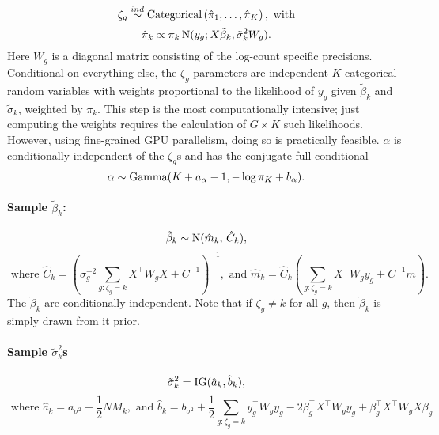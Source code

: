 \begin{itemize}
\begin{equation*}
\zeta_g \stackrel{ind}{\sim} \operatorname{Categorical}\left(\hat{\pi}_1,\ldots,\hat{\pi}_K \right), \mbox{ with}
\end{equation*}
\begin{equation*}
\hat{\pi}_k \propto \pi_k \operatorname{N}(y_g;X\tilde{\beta}_k,\tilde{\sigma}_k^2 W_g).
\end{equation*}
Here $W_g$ is a diagonal matrix consisting of the log-count specific precisions. Conditional on everything else, the $\zeta_g$ parameters are independent $K$-categorical random variables with weights proportional to the likelihood of $y_g$ given $\tilde{\beta}_k$ and $\tilde{\sigma}_k$, weighted by $\pi_k$. This step is the most computationally intensive; just computing the weights requires the calculation of $G\times K$ such likelihoods. However, using fine-grained GPU parallelism, doing so is practically feasible. $\alpha$ is conditionally independent of the $\zeta_g$s and has the conjugate full conditional
\begin{equation*}
\alpha \sim \operatorname{Gamma}(K + a_\alpha - 1, -\log \pi_K + b_\alpha).
\end{equation*}


\paragraph{Sample $\tilde{\beta}_k$:}
\begin{equation*}
\tilde{\beta}_k \sim \operatorname{N}(\hat{m}_k,\, \hat{C}_k),
\end{equation*}
\begin{equation*}
\mbox{ where }\hat{C}_k= \left( \sigma^{-2}_g\sum_{g:\zeta_g=k}
  X^\top W_g X + C^{-1} \right)^{-1}, \mbox{ and }\hat{m}_k=\hat{C}_k \left(\sum_{g:\zeta_g=k} X^\top W_g y_g +
      C^{-1}m \right).
\end{equation*}
The $\tilde{\beta}_k$ are conditionally independent. Note that if $\zeta_g \neq k$ for all $g$, then $\tilde{\beta}_k$ is simply drawn from it prior.

\paragraph{Sample $\tilde{\sigma}_k^2$s}
\begin{equation*}
      \tilde{\sigma}_k^2 = \operatorname{IG}(\hat{a}_k,\hat{b}_k),
    \end{equation*}
    \begin{equation*}
      \mbox{ where }\hat{a}_k = a_{\sigma^2} + \frac{1}{2}NM_k,\mbox{ and }\hat{b}_k= b_{\sigma^2} + \frac{1}{2}\sum_{g:\zeta_g=k}y_g^\top W_g y_g -2 \beta_g^\top X^\top W_g y_g  +\beta_g^\top X^\top W_g X \beta_g
    \end{equation*}


\end{itemize}
